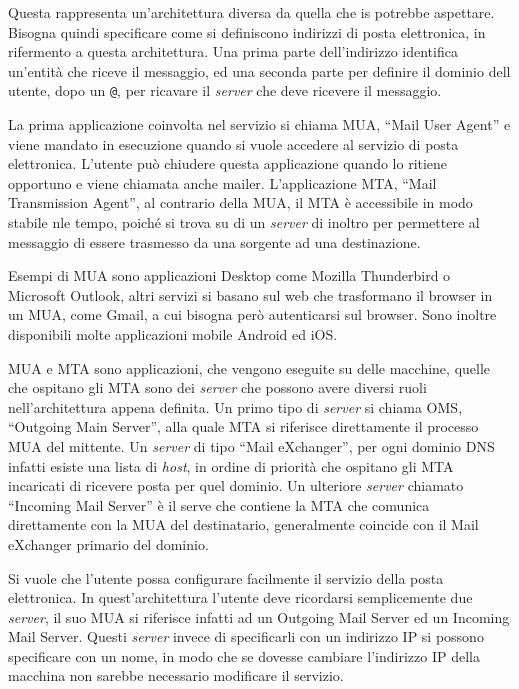 \documentclass{article}
\numberwithin{equation}{subsection}
\begin{document}
Questa rappresenta un'architettura diversa da quella che \textcolor{Emerald}{is} potrebbe aspettare. Bisogna quindi specificare come si definiscono indirizzi di posta elettronica, in rifermento a questa architettura. Una prima parte dell'indirizzo identifica un'entità che riceve il messaggio, ed una seconda parte per definire il dominio dell utente, dopo un \verb|@|, per ricavare il \textit{server} che deve ricevere il messaggio. 

La prima applicazione coinvolta nel servizio si chiama MUA, ``Mail User Agent'' e viene mandato in esecuzione quando si vuole accedere al servizio di posta elettronica. L'utente può chiudere questa applicazione quando lo ritiene opportuno e viene chiamata anche mailer. 
L'applicazione MTA, ``Mail Transmission Agent'', al contrario della MUA, il MTA è accessibile in modo stabile nle tempo, poiché si trova su di un \textit{server} di inoltro per permettere al messaggio di essere trasmesso da una sorgente ad una destinazione. 

Esempi di MUA sono applicazioni Desktop come Mozilla Thunderbird o Microsoft Outlook, altri servizi si basano sul web che trasformano il browser in un MUA, come Gmail, a cui bisogna però autenticarsi sul browser. Sono inoltre disponibili molte applicazioni mobile Android ed iOS. 

MUA e MTA sono applicazioni, che vengono eseguite su delle macchine, quelle che ospitano gli MTA sono dei \textit{server} che possono avere diversi ruoli nell'architettura appena definita. Un primo tipo di \textit{server} si chiama OMS, ``Outgoing Main Server'', alla quale MTA si riferisce direttamente il processo MUA del mittente. 
Un \textit{server} di tipo ``Mail eXchanger'', per ogni dominio \textcolor{Mahogany}{DNS} infatti esiste una lista di \textit{host}, in ordine di priorità che ospitano gli MTA incaricati di ricevere posta per quel dominio. 
Un ulteriore \textit{server} chiamato ``Incoming Mail Server'' è il serve che contiene la MTA che comunica direttamente con la MUA del destinatario, generalmente coincide con il Mail eXchanger primario del dominio. 

Si vuole che l'utente possa configurare facilmente il servizio della posta elettronica. In quest'architettura l'utente deve ricordarsi semplicemente due \textit{server}, il suo MUA si riferisce infatti ad un Outgoing Mail Server ed un Incoming Mail Server. Questi \textit{server} invece di specificarli con un indirizzo \textcolor{Bittersweet}{IP} si possono specificare con un nome, in modo che se dovesse cambiare l'indirizzo \textcolor{Bittersweet}{IP} della macchina non sarebbe necessario modificare il servizio. 
\end{document}
